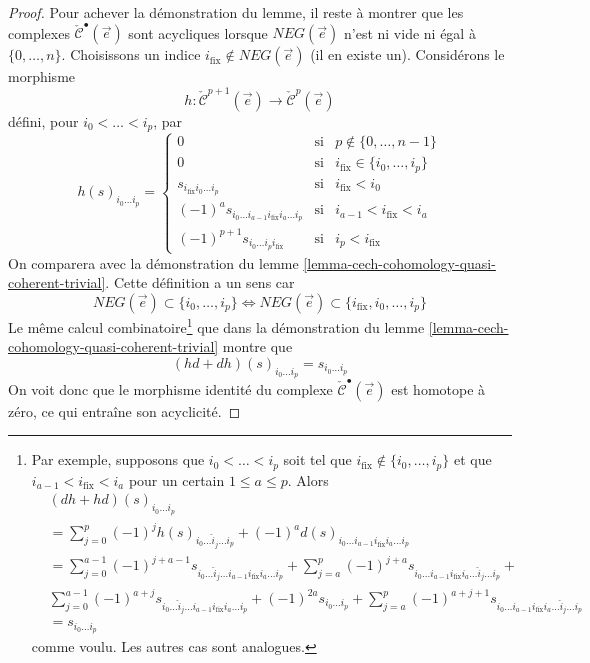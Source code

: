 \begin{proof}
\medskip\noindent
Pour achever la démonstration du lemme, il reste à montrer que les complexes
$\check{\mathcal{C}}^\bullet(\vec{e})$ sont acycliques lorsque
$NEG(\vec{e})$ n'est ni vide ni égal à $\{0, \ldots, n\}$.
Choisissons un indice $i_{\text{fix}} \not \in NEG(\vec{e})$ (il en existe un).
Considérons le morphisme
$$
h :
\check{\mathcal{C}}^{p + 1}(\vec{e})
\to
\check{\mathcal{C}}^p(\vec{e})
$$
défini, pour $i_0 < \ldots < i_p$, par
$$
h(s)_{i_0 \ldots i_p} =
\left\{
\begin{matrix}
0 & \text{si} & p \not \in \{0, \ldots, n - 1\} \\
0 & \text{si} & i_{\text{fix}} \in \{i_0, \ldots, i_p\} \\
s_{i_{\text{fix}} i_0 \ldots i_p} & \text{si} & i_{\text{fix}} < i_0 \\
(-1)^a s_{i_0 \ldots i_{a - 1} i_{\text{fix}} i_a \ldots i_p} &
\text{si} & i_{a - 1} < i_{\text{fix}} < i_a \\
(-1)^{p + 1} s_{i_0 \ldots i_p i_{\text{fix}}} &
\text{si} & i_p < i_{\text{fix}}
\end{matrix}
\right.
$$
On comparera avec la démonstration du
lemme \ref{lemma-cech-cohomology-quasi-coherent-trivial}.
Cette définition a un sens car
$$
NEG(\vec{e}) \subset \{i_0, \ldots, i_p\}
\Leftrightarrow
NEG(\vec{e}) \subset \{i_{\text{fix}}, i_0, \ldots, i_p\}
$$
Le même calcul combinatoire\footnote{
Par exemple, supposons que $i_0 < \ldots < i_p$ soit tel que
$i_{\text{fix}} \not \in \{i_0, \ldots, i_p\}$ et que
$i_{a - 1} < i_{\text{fix}} < i_a$ pour un certain $1 \leq a \leq p$. Alors
\begin{align*}
&
(dh + hd)(s)_{i_0 \ldots i_p} \\
& =
\sum\nolimits_{j = 0}^p
(-1)^j
h(s)_{i_0 \ldots \hat i_j \ldots i_p}
+
(-1)^a d(s)_{i_0 \ldots i_{a - 1} i_{\text{fix}} i_a \ldots i_p}\\
& =
\sum\nolimits_{j = 0}^{a - 1}
(-1)^{j + a - 1}
s_{i_0 \ldots \hat i_j \ldots i_{a - 1} i_{\text{fix}} i_a \ldots i_p} +
\sum\nolimits_{j = a}^p
(-1)^{j + a}
s_{i_0 \ldots i_{a - 1} i_{\text{fix}} i_a \ldots \hat i_j \ldots i_p}
+ \\
&
\sum\nolimits_{j = 0}^{a - 1}
(-1)^{a + j}
s_{i_0 \ldots \hat i_j \ldots i_{a - 1} i_{\text{fix}} i_a \ldots i_p} +
(-1)^{2a} s_{i_0 \ldots i_p} +
\sum\nolimits_{j = a}^p
(-1)^{a + j + 1}
s_{i_0 \ldots i_{a - 1} i_{\text{fix}} i_a \ldots \hat i_j \ldots i_p}
\\
& =
s_{i_0 \ldots i_p}
\end{align*}
comme voulu. Les autres cas sont analogues.}
que dans la démonstration du lemme \ref{lemma-cech-cohomology-quasi-coherent-trivial}
montre que
$$
(hd + dh)(s)_{i_0 \ldots i_p}
=
s_{i_0 \ldots i_p}
$$
On voit donc que le morphisme identité du complexe
$\check{\mathcal{C}}^\bullet(\vec{e})$ est homotope à zéro,
ce qui entraîne son acyclicité.
\end{proof}

